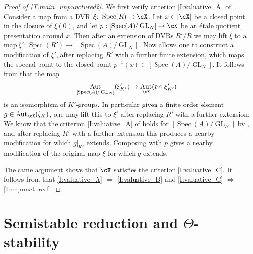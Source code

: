 \documentclass[a4paper]{amsart}
\numberwithin{equation}{section}
\theoremstyle{plain}
\theoremstyle{definition}
\DeclareMathOperator{\Spec}{Spec}
\DeclareMathOperator{\GL}{GL}
\DeclareMathOperator{\Aut}{Aut}
\newcommand{\co}{\colon}
\begin{document}
\begin{proof} [Proof of  \eqref{T:main_unpunctured2}]
We first verify criterion \eqref{I:valuative_A} of . 
Consider a map from a DVR $\xi \co \Spec(R) \to \cX$. Let $x \in |\cX|$ be a closed point in the closure of $\xi(0)$, and let $p : [\Spec(A)/\GL_N] \to \cX$ be an \'etale quotient presentation around $x$. Then after an extension of DVRs $R'/R$ we may lift $\xi$ to a map $\xi' : \Spec(R') \to [\Spec(A)/\GL_N]$. Now   allows one to construct a modification of $\xi'$, after replacing $R'$ with a further finite extension, which maps the special point to the closed point $p^{-1}(x) \in [\Spec(A)/\GL_N]$. It follows from  that the map
\[
\Aut_{[\Spec(A)/\GL_N]} (\xi'_{K'}) \to \Aut_{\cX}(p\circ \xi'_{K'})
\]
is an isomorphism of $K'$-groups. In particular given a finite order element $g \in \Aut_{\cX}(\xi_K)$, one may lift this to $\xi'$ after replacing $R'$ with a further extension. We know that the criterion \eqref{I:valuative_A} of  holds for $[\Spec(A)/\GL_N]$ by , and after replacing $R'$ with a further extension this produces a nearby modification for which $g|_{K'}$ extends. Composing with $p$ gives a nearby modification of the original map $\xi$ for which $g$ extends.  

The same argument shows that $\cX$ satisfies the criterion \eqref{I:valuative_C}. It follows from  that \eqref{I:valuative_A} $\Rightarrow$ \eqref{I:valuative_B} and \eqref{I:valuative_C} $\Rightarrow$ \eqref{I:unpunctured}.
\end{proof}







\section{Semistable reduction and \texorpdfstring{$\Theta$}{Theta}-stability}\label{S:semistable_reduction}
\end{document}
